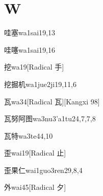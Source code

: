 
\section*{W}

\begin{verbete}{哇塞}{wa1sai1}{9,13}
\end{verbete}

\begin{verbete}{哇噻}{wa1sai1}{9,16}
\end{verbete}

\begin{verbete}{挖}{wa1}{9}[Radical 手]
\end{verbete}

\begin{verbete}{挖掘机}{wa1jue2ji1}{9,11,6}
\end{verbete}

\begin{verbete}{瓦}{wa3}{4}[Radical 瓦][Kangxi 98]
\end{verbete}

\begin{verbete}{瓦努阿图}{wa3nu3'a1tu2}{4,7,7,8}
\end{verbete}

\begin{verbete}{瓦特}{wa3te4}{4,10}
\end{verbete}

\begin{verbete}{歪}{wai1}{9}[Radical 止]
\end{verbete}

\begin{verbete}{歪果仁}{wai1guo3ren2}{9,8,4}
\end{verbete}

\begin{verbete}{外}{wai4}{5}[Radical 夕]
\end{verbete}

